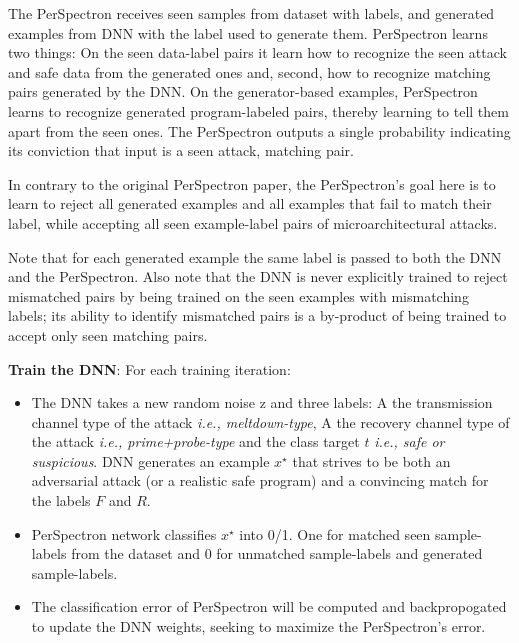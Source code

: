  The PerSpectron receives seen samples from dataset  with labels, and generated examples from DNN with the label used to generate them.  PerSpectron learns two things: 
 On the seen data-label pairs it learn
 how to recognize the seen attack and safe data from the generated ones and, second, how to recognize matching pairs generated by the DNN. On the generator-based examples, PerSpectron learns to recognize generated program-labeled pairs, thereby learning to tell them apart from the seen ones. The PerSpectron outputs a single probability indicating its conviction that input is a seen attack, matching pair. 
 
\begin{note}
{In contrary to the original PerSpectron paper, the PerSpectron's goal here is to learn to reject all generated examples and all examples that fail to match their label, while accepting all seen example-label pairs of microarchitectural attacks.}
 \end{note}
 
 Note that for each generated example the same label is passed to both the DNN and the PerSpectron. Also note that the DNN is never explicitly trained to reject mismatched pairs by being trained on the seen examples with mismatching labels; its ability to identify mismatched pairs is a by-product of being trained to accept only seen matching pairs. 
 
 
\noindent\textbf{Train the DNN}:
For each training iteration:

\begin{itemize}  [topsep=0pt,parsep=0pt,partopsep=0pt, label={--}, leftmargin=*] %
\item  The DNN takes a new random noise z and three labels: A the transmission channel type of the attack {\em i.e., meltdown-type}, A the recovery channel type of the attack {\em i.e., prime+probe-type} and the class target $t$ {\em i.e., safe or suspicious}. DNN generates an example $x^{\star}$ that strives to be both an adversarial attack (or a realistic safe program) and a convincing match for the labels $F$ and $R$.  

\item PerSpectron network classifies $x^{\star}$ into 0/1. One for matched seen sample-labels from the dataset and 0 for unmatched sample-labels and generated sample-labels.    


\item  The classification error of PerSpectron will be computed and backpropogated to update the DNN weights, seeking to maximize the PerSpectron's error. 

\end{itemize}

